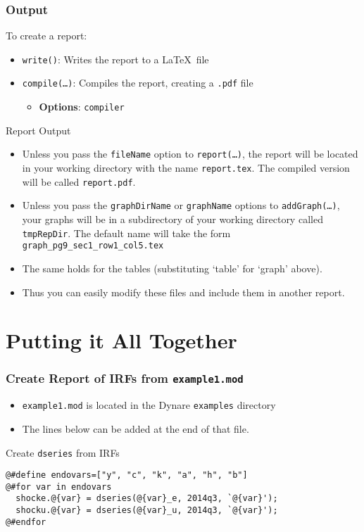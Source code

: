 \documentclass[10pt]{beamer}
\newcommand{\myitem}{\item[$\bullet$]}
\begin{document}
\begin{frame}[fragile,t]
  \frametitle{Output}
  To create a report:
  \begin{itemize}
  \myitem \texttt{write()}: Writes the report to a \LaTeX\ file
  \myitem \texttt{compile(\ldots)}: Compiles the report, creating a \texttt{.pdf} file
    \begin{itemize}
    \myitem \textbf{Options}: \texttt{compiler}
    \end{itemize}
  \end{itemize}
  Report Output
  \begin{itemize}
  \myitem Unless you pass the \texttt{fileName} option to \texttt{report(\ldots)}, the report will be located in your working directory with the name \texttt{report.tex}. The compiled version will be called \texttt{report.pdf}.
  \myitem Unless you pass the \texttt{graphDirName} or \texttt{graphName} options to \texttt{addGraph(\ldots)}, your graphs will be in a subdirectory of your working directory called \texttt{tmpRepDir}. The default name will take the form \texttt{graph\_pg9\_sec1\_row1\_col5.tex}
  \myitem The same holds for the tables (substituting `table' for `graph' above).
  \myitem Thus you can easily modify these files and include them in another report.
  \end{itemize}
\end{frame}


\section{Putting it All Together}
\begin{frame}[fragile=singleslide,t]
  \frametitle{Create Report of IRFs from \texttt{example1.mod}}
  \begin{itemize}
  \myitem \texttt{example1.mod} is located in the Dynare \texttt{examples} directory
  \myitem The lines below can be added at the end of that file.
  \end{itemize}
  \begin{block}{Create \texttt{dseries} from IRFs}
\begin{verbatim}
@#define endovars=["y", "c", "k", "a", "h", "b"]
@#for var in endovars
  shocke.@{var} = dseries(@{var}_e, 2014q3, `@{var}');
  shocku.@{var} = dseries(@{var}_u, 2014q3, `@{var}');
@#endfor
\end{verbatim}
  \end{block}
\end{frame}
\end{document}
